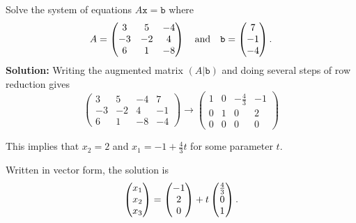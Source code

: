 \begin{example}
    Solve the system of equations $A\texttt{x} = \texttt{b}$ where
\[ A = \begin{pmatrix} 3 & 5 & -4 \\ -3 & -2 & 4 \\ 6 & 1 & -8 \end{pmatrix} \quad \text{and} \quad
    \texttt{b} = \begin{pmatrix} 7 \\ -1 \\ -4 \end{pmatrix}. \]
    {\bf Solution:} 
    Writing the augmented matrix $(A | \texttt{b})$ and doing several steps of row reduction gives
\[ \left( \begin{array}{ccc|c}
        3 & 5 & -4 & 7 \\
        -3 & -2 & 4 & -1 \\
        6 & 1 & -8 & -4 \end{array} \right)
    \longrightarrow 
    \left( \begin{array}{ccc|c}
        1 & 0 & -\frac{4}{3} & -1 \\
        0 & 1 & 0 & 2 \\
        0 & 0 & 0 & 0 \end{array} \right)
        \]

This implies that $x_2 = 2$ and $x_1 = -1 + \frac{4}{3} t$ for some parameter $t$.

Written in vector form, the solution is
\[ \begin{pmatrix} x_1 \\ x_2 \\ x_3 \end{pmatrix} = \begin{pmatrix} -1 \\ 2 \\ 0 \end{pmatrix} + t \begin{pmatrix} \frac{4}{3} \\ 0 \\ 1
    \end{pmatrix}. \]
\end{example}


